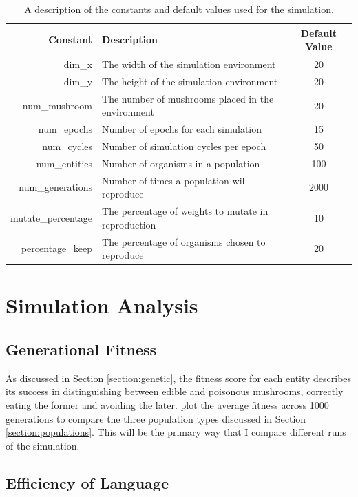 \documentclass[12pt,a4paper,twoside,openright]{report}
\begin{document}
\begin{table}[t]
\centering
 \begin{tabular}{ r | l | c}
 \bf{Constant} & \bf{Description} & \bf{Default Value} \\ [0.5ex] 
 \hline
dim\_x & The width of the simulation environment & 20 \\
dim\_y & The height of the simulation environment & 20 \\
num\_mushroom & The number of mushrooms placed in the environment & 20 \\
num\_epochs &  Number of epochs for each simulation & 15 \\ 
num\_cycles & Number of simulation cycles per epoch & 50 \\
num\_entities & Number of organisms in a population & 100 \\
num\_generations & Number of times a population will reproduce & 2000 \\
mutate\_percentage & The percentage of weights to mutate in reproduction & 10 \\
percentage\_keep & The percentage of organisms chosen to reproduce & 20 \\
\end{tabular}
\caption{A description of the constants and default values used for the simulation.}
\label{table:constants}
\end{table}

\section{Simulation Analysis}\label{section:analysis}

\subsection{Generational Fitness}

As discussed in Section \ref{section:genetic}, the fitness score for each entity describes its success in distinguishing between edible and poisonous mushrooms, correctly eating the former and avoiding the later. \cite{Cangelosi1998} plot the average fitness across 1000 generations to compare the three population types discussed in Section \ref{section:populations}. This will be the primary way that I compare different runs of the simulation.

\subsection{Efficiency of Language}\label{section:efficiency}
\end{document}
